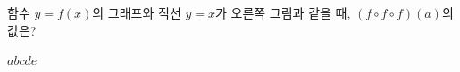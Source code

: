 \hspace*{2mm}\begin{minipage}[t]{\dimexpr\linewidth-2mm\relax}\vspace{0pt}
\noindent\begin{minipage}[t]{0.58\linewidth}\vspace{0pt}\raggedright 함수 $y=f(x)$의 그래프와 직선 $y=x$가 오른쪽 그림과 같을 때, $(f\circ f\circ f)(a)$의 값은? \end{minipage}\hfill\begin{minipage}[t]{0.4\linewidth}\vspace{0pt}\centering \resizebox{\ifdim\width>\linewidth\linewidth\else\width\fi}{!}{}\end{minipage}\par
\begin{choices32}{$a$}{$b$}{$c$}{$d$}{$e$}\end{choices32}\end{minipage}
